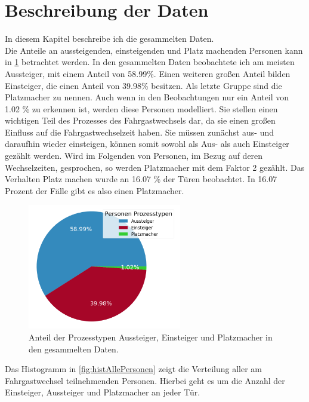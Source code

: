 \section{Beschreibung der Daten} \label{Beschreibung der Daten}
In diesem Kapitel beschreibe ich die gesammelten Daten.\\
Die Anteile an aussteigenden, einsteigenden und Platz machenden Personen kann in \figurename \ref{fig:AnteileProzesstypen} betrachtet werden. In den gesammelten Daten beobachtete ich am meisten Aussteiger, mit einem Anteil von 58.99\%. Einen weiteren großen Anteil bilden Einsteiger, die einen Anteil von 39.98\% besitzen. Als letzte Gruppe sind die Platzmacher zu nennen. Auch wenn in den Beobachtungen nur ein Anteil von 1.02 \% zu erkennen ist, werden diese Personen modelliert. Sie stellen einen wichtigen Teil des Prozesses des Fahrgastwechsels dar, da sie einen großen Einfluss auf die Fahrgastwechselzeit haben. Sie müssen zunächst aus- und daraufhin wieder einsteigen, können somit sowohl als Aus- als auch Einsteiger gezählt werden. Wird im Folgenden von Personen, im Bezug auf deren Wechselzeiten, gesprochen, so werden Platzmacher mit dem Faktor 2 gezählt. Das Verhalten Platz machen wurde an 16.07 \% der Türen beobachtet. In 16.07 Prozent der Fälle gibt es also einen Platzmacher.
\begin{figure}[H]
	\centering
		\includegraphics[width=0.6\textwidth]{pictures/data_evaluation/data_description/process_types.png}
	\caption{Anteil der Prozesstypen Aussteiger, Einsteiger und Platzmacher in den gesammelten Daten.}
	\label{fig:AnteileProzesstypen}
\end{figure}
Das Histogramm in \figurename\ref{fig:histAllePersonen} zeigt die Verteilung aller am Fahrgastwechsel teilnehmenden Personen. Hierbei geht es um die Anzahl der Einsteiger, Aussteiger und Platzmacher an jeder Tür.
